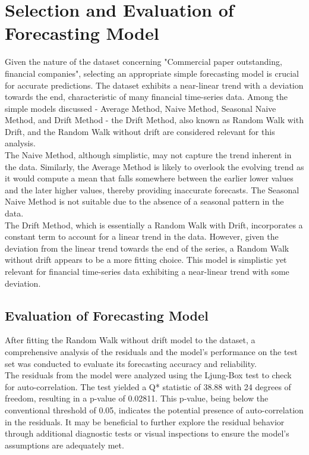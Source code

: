 \section{Selection and Evaluation of Forecasting Model}\label{sec:selection-and-evaluation-of-forecasting-model}

Given the nature of the dataset concerning "Commercial paper outstanding, financial companies", selecting an appropriate simple forecasting model is crucial for accurate predictions.
The dataset exhibits a near-linear trend with a deviation towards the end, characteristic of many financial time-series data.
Among the simple models discussed - Average Method, Naive Method, Seasonal Naive Method, and Drift Method - the Drift Method, also known as Random Walk with Drift, and the Random Walk without drift are considered relevant for this analysis.\\

The Naive Method, although simplistic, may not capture the trend inherent in the data.
Similarly, the Average Method is likely to overlook the evolving trend as it would compute a mean that falls somewhere between the earlier lower values and the later higher values, thereby providing inaccurate forecasts.
The Seasonal Naive Method is not suitable due to the absence of a seasonal pattern in the data.\\

The Drift Method, which is essentially a Random Walk with Drift, incorporates a constant term to account for a linear trend in the data.
However, given the deviation from the linear trend towards the end of the series, a Random Walk without drift appears to be a more fitting choice.
This model is simplistic yet relevant for financial time-series data exhibiting a near-linear trend with some deviation.

\subsection{Evaluation of Forecasting Model}\label{subsec:evaluation-of-forecasting-model}

After fitting the Random Walk without drift model to the dataset, a comprehensive analysis of the residuals and the model's performance on the test set was conducted
to evaluate its forecasting accuracy and reliability.\\

The residuals from the model were analyzed using the Ljung-Box test to check for auto-correlation.
The test yielded a Q* statistic of 38.88 with 24 degrees of freedom, resulting in a p-value of 0.02811.
This p-value, being below the conventional threshold of 0.05, indicates the potential presence of auto-correlation in the residuals.
It may be beneficial to further explore the residual behavior through additional diagnostic tests or visual inspections to ensure the model's assumptions are adequately met.\\

